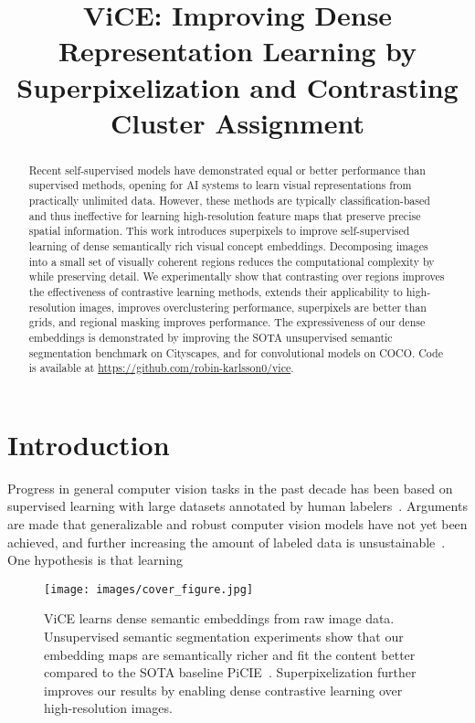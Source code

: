 \documentclass{bmvc2k}
\title{ViCE: Improving Dense Representation Learning by Superpixelization and Contrasting Cluster Assignment}
\begin{document}
\maketitle

\begin{abstract}
Recent self-supervised models have demonstrated equal or better performance than supervised methods, opening for AI systems to learn visual representations from practically unlimited data. However, these methods are typically classification-based and thus ineffective for learning high-resolution feature maps that preserve precise spatial information. This work introduces superpixels to improve self-supervised learning of dense semantically rich visual concept embeddings. Decomposing images into a small set of visually coherent regions reduces the computational complexity by  while preserving detail. We experimentally show that contrasting over regions improves the effectiveness of contrastive learning methods, extends their applicability to high-resolution images, improves overclustering performance, superpixels are better than grids, and regional masking improves performance. The expressiveness of our dense embeddings is demonstrated by improving the SOTA unsupervised semantic segmentation benchmark on Cityscapes, and for convolutional models on COCO. Code is available at \url{https://github.com/robin-karlsson0/vice}.
\end{abstract}



\section{Introduction}
\label{sec:introduction}

Progress in general computer vision tasks in the past decade has been based on supervised learning with large datasets annotated by human labelers~\cite{Krizhevsky2012ImageNetConv}. Arguments are made that generalizable and robust computer vision models have not yet been achieved, and further increasing the amount of labeled data is unsustainable~\cite{LeCunn2020AAAI20SSL, Marcus2019RebootingAI}. One hypothesis is that learning

\begin{figure}[h]
\begin{center}
\texttt{[image: images/cover\_figure.jpg]}
\end{center}
   \caption{ViCE learns dense semantic embeddings from raw image data. Unsupervised semantic segmentation experiments show that our embedding maps are semantically richer and fit the content better compared to the SOTA baseline PiCIE~\cite{Cho2021PiCIE}. Superpixelization further improves our results by enabling dense contrastive learning over high-resolution images.}
\label{fig:front_cover}
\end{figure}
\end{document}
